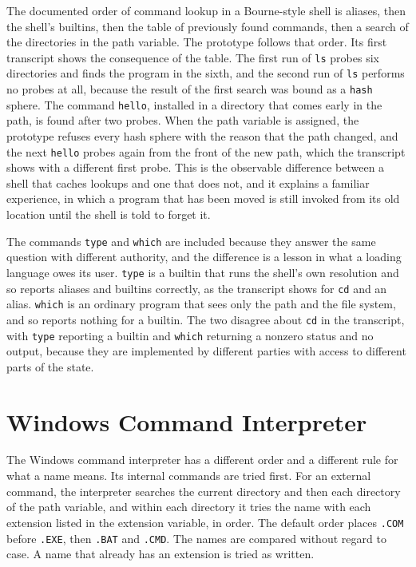 \documentclass[11pt,oneside]{report}
\theoremstyle{plain}
\theoremstyle{definition}
\theoremstyle{remark}
\newcommand{\transcript}[1]{}
\begin{document}
The documented order of command lookup in a Bourne-style shell \cite{bash-ref} is aliases, then the shell's builtins, then the table of previously found commands, then a search of the directories in the path variable. The prototype follows that order. Its first transcript shows the consequence of the table. The first run of \texttt{ls} probes six directories and finds the program in the sixth, and the second run of \texttt{ls} performs no probes at all, because the result of the first search was bound as a \texttt{hash} sphere. The command \texttt{hello}, installed in a directory that comes early in the path, is found after two probes. When the path variable is assigned, the prototype refuses every hash sphere with the reason that the path changed, and the next \texttt{hello} probes again from the front of the new path, which the transcript shows with a different first probe. This is the observable difference between a shell that caches lookups and one that does not, and it explains a familiar experience, in which a program that has been moved is still invoked from its old location until the shell is told to forget it.

\transcript{shell}

The commands \texttt{type} and \texttt{which} are included because they answer the same question with different authority, and the difference is a lesson in what a loading language owes its user. \texttt{type} is a builtin that runs the shell's own resolution and so reports aliases and builtins correctly, as the transcript shows for \texttt{cd} and an alias. \texttt{which} is an ordinary program that sees only the path and the file system, and so reports nothing for a builtin. The two disagree about \texttt{cd} in the transcript, with \texttt{type} reporting a builtin and \texttt{which} returning a nonzero status and no output, because they are implemented by different parties with access to different parts of the state.

\section{Windows Command Interpreter}

The Windows command interpreter has a different order and a different rule for what a name means. Its internal commands are tried first. For an external command, the interpreter searches the current directory and then each directory of the path variable, and within each directory it tries the name with each extension listed in the extension variable, in order. The default order places \texttt{.COM} before \texttt{.EXE}, then \texttt{.BAT} and \texttt{.CMD}. The names are compared without regard to case. A name that already has an extension is tried as written.
\end{document}
